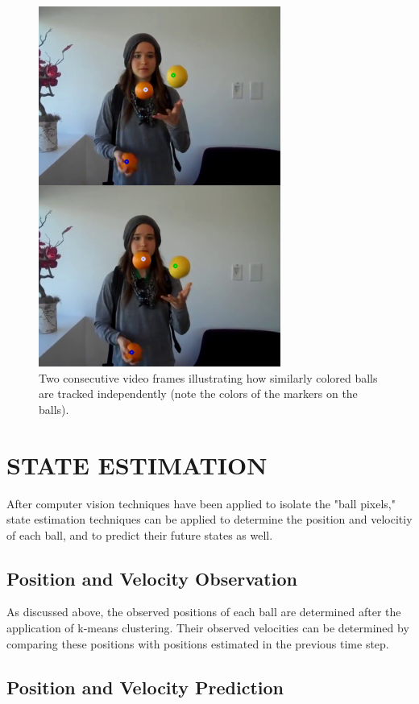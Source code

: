 \documentclass[letterpaper, 10 pt, conference]{ieeeconf}  %
\begin{document}
\begin{figure}
\centering
    \includegraphics{matching.png}
    \caption{Two consecutive video frames illustrating how similarly colored balls are tracked independently (note the colors of the markers on the balls).}
    \label{fig:matching}
\end{figure}

\section{STATE ESTIMATION}

After computer vision techniques have been applied to isolate the "ball pixels," state estimation techniques can be applied to determine the position and velocitiy of each ball, and to predict their future states as well.

\subsection{Position and Velocity Observation}

As discussed above, the observed positions of each ball are determined after the application of k-means clustering. Their observed velocities can be determined by comparing these positions with positions estimated in the previous time step.

\subsection{Position and Velocity Prediction}
\end{document}
